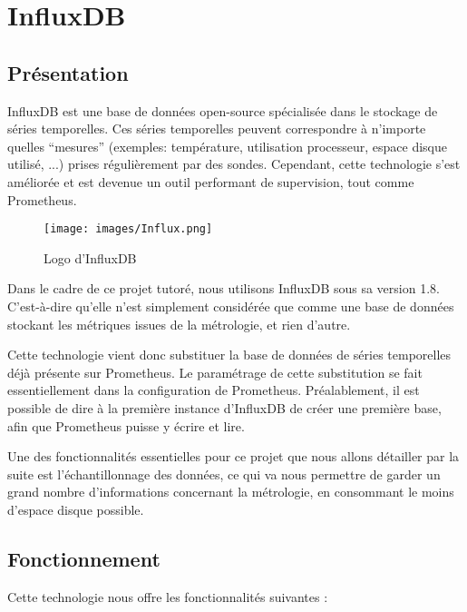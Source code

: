 \documentclass[oneside,12pt]{report}
\begin{document}
\newpage

\section{InfluxDB}

\subsection{Présentation}

InfluxDB est une base de données open-source spécialisée dans le stockage de séries temporelles. Ces séries temporelles peuvent correspondre à n'importe quelles “mesures” (exemples: température, utilisation processeur, espace disque utilisé, ...) prises régulièrement par des sondes. Cependant, cette technologie s'est améliorée et est devenue un outil performant de supervision, tout comme Prometheus.\newline

\begin{figure}[!ht]
    \centering
    \texttt{[image: images/Influx.png]}
    \caption{Logo d'InfluxDB}
    \label{fig:mesh1}
\end{figure}

Dans le cadre de ce projet tutoré, nous utilisons InfluxDB sous sa version 1.8. C'est-à-dire qu'elle n'est simplement considérée que comme une base de données stockant les métriques issues de la métrologie, et rien d'autre.\newline

Cette technologie vient donc substituer la base de données de séries temporelles déjà présente sur Prometheus. Le paramétrage de cette substitution se fait essentiellement dans la configuration de Prometheus. Préalablement, il est possible de dire à la première instance d'InfluxDB de créer une première base, afin que Prometheus puisse y écrire et lire.\newline

Une des fonctionnalités essentielles pour ce projet que nous allons détailler par la suite est l'échantillonnage des données, ce qui va nous permettre de garder un grand nombre d'informations concernant la métrologie, en consommant le moins d'espace disque possible.

\subsection{Fonctionnement}

Cette technologie nous offre les fonctionnalités suivantes : \newline
\end{document}
